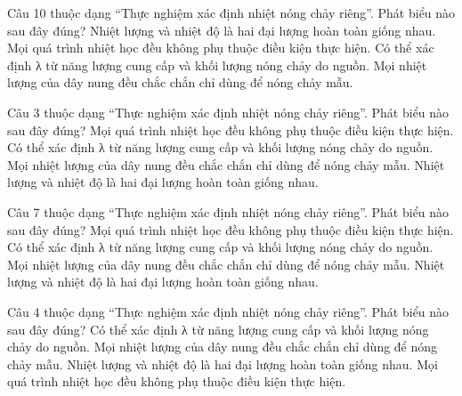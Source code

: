 \begin{ex}
Câu 10 thuộc dạng “Thực nghiệm xác định nhiệt nóng chảy riêng”. Phát biểu nào sau đây đúng?
\choice
{Nhiệt lượng và nhiệt độ là hai đại lượng hoàn toàn giống nhau.}
{Mọi quá trình nhiệt học đều không phụ thuộc điều kiện thực hiện.}
{\True Có thể xác định λ từ năng lượng cung cấp và khối lượng nóng chảy do nguồn.}
{Mọi nhiệt lượng của dây nung đều chắc chắn chỉ dùng để nóng chảy mẫu.}
\end{ex}

\begin{ex}
Câu 3 thuộc dạng “Thực nghiệm xác định nhiệt nóng chảy riêng”. Phát biểu nào sau đây đúng?
\choice
{Mọi quá trình nhiệt học đều không phụ thuộc điều kiện thực hiện.}
{\True Có thể xác định λ từ năng lượng cung cấp và khối lượng nóng chảy do nguồn.}
{Mọi nhiệt lượng của dây nung đều chắc chắn chỉ dùng để nóng chảy mẫu.}
{Nhiệt lượng và nhiệt độ là hai đại lượng hoàn toàn giống nhau.}
\end{ex}

\begin{ex}
Câu 7 thuộc dạng “Thực nghiệm xác định nhiệt nóng chảy riêng”. Phát biểu nào sau đây đúng?
\choice
{Mọi quá trình nhiệt học đều không phụ thuộc điều kiện thực hiện.}
{\True Có thể xác định λ từ năng lượng cung cấp và khối lượng nóng chảy do nguồn.}
{Mọi nhiệt lượng của dây nung đều chắc chắn chỉ dùng để nóng chảy mẫu.}
{Nhiệt lượng và nhiệt độ là hai đại lượng hoàn toàn giống nhau.}
\end{ex}

\begin{ex}
Câu 4 thuộc dạng “Thực nghiệm xác định nhiệt nóng chảy riêng”. Phát biểu nào sau đây đúng?
\choice
{\True Có thể xác định λ từ năng lượng cung cấp và khối lượng nóng chảy do nguồn.}
{Mọi nhiệt lượng của dây nung đều chắc chắn chỉ dùng để nóng chảy mẫu.}
{Nhiệt lượng và nhiệt độ là hai đại lượng hoàn toàn giống nhau.}
{Mọi quá trình nhiệt học đều không phụ thuộc điều kiện thực hiện.}
\end{ex}

